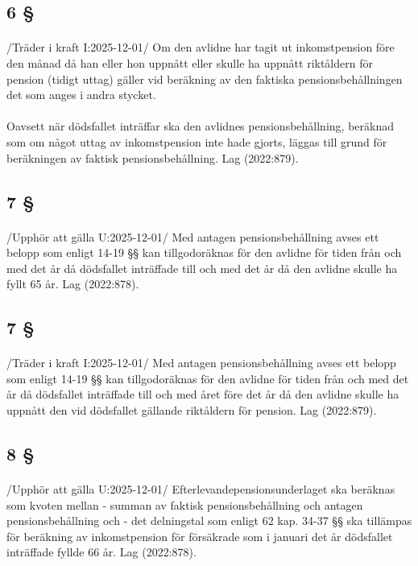 \documentclass[a4paper,notitlepage,openany,10pt]{book}
\begin{document}
\subsection*{6 §}
\paragraph*{}
/Träder i kraft I:2025-12-01/
Om den avlidne har tagit ut inkomstpension före den månad då han eller hon uppnått eller skulle ha uppnått riktåldern för pension (tidigt uttag) gäller vid beräkning av den faktiska pensionsbehållningen det som anges i andra stycket.
\paragraph*{}
Oavsett när dödsfallet inträffar ska den avlidnes pensionsbehållning, beräknad som om något uttag av inkomstpension inte hade gjorts, läggas till grund för beräkningen av faktisk pensionsbehållning.
Lag (2022:879).
\subsection*{7 §}
\paragraph*{}
/Upphör att gälla U:2025-12-01/
Med antagen pensionsbehållning avses ett belopp som enligt 14-19 §§ kan tillgodoräknas för den avlidne för tiden från och med det år då dödsfallet inträffade till och med det år då den avlidne skulle ha fyllt 65 år.
Lag (2022:878).
\subsection*{7 §}
\paragraph*{}
/Träder i kraft I:2025-12-01/
Med antagen pensionsbehållning avses ett belopp som enligt 14-19 §§ kan tillgodoräknas för den avlidne för tiden från och med det år då dödsfallet inträffade till och med året före det år då den avlidne skulle ha uppnått den vid dödsfallet gällande riktåldern för pension.
Lag (2022:879).
\subsection*{8 §}
\paragraph*{}
/Upphör att gälla U:2025-12-01/
Efterlevandepensionsunderlaget ska beräknas som kvoten mellan
\newline - summan av faktisk pensionsbehållning och antagen pensionsbehållning och
\newline - det delningstal som enligt 62 kap. 34-37 §§ ska tillämpas för beräkning av inkomstpension för försäkrade som i januari det år dödsfallet inträffade fyllde 66 år.
Lag (2022:878).
\end{document}
